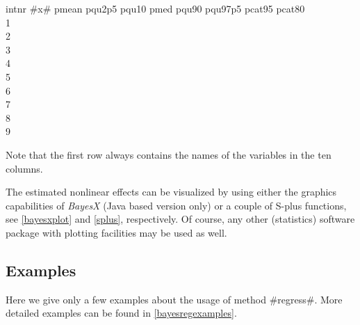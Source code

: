 \footnotesize
intnr  \quad #x# \quad  pmean \quad pqu2p5 \quad pqu10 \quad pmed \quad pqu90 \quad pqu97p5 \quad pcat95 \quad   pcat80 \\
1           \\
2                 \\
3              \\
4               \\
5                \\
6              \\
7                  \\
8             \\
9                

\normalsize

Note that the first row always contains the names of the variables
in the ten columns.

The estimated nonlinear effects can be visualized by using either
the graphics capabilities of {\em BayesX} (Java based version
only) or a couple of S-plus functions, see \autoref{bayesxplot}
and \autoref{splus}, respectively. Of course, any other
(statistics) software package with plotting facilities may be used
as well.

\subsection{Examples}

Here we give only a few examples about the usage of method
#regress#. More detailed examples can be found in
\autoref{bayesregexamples}.

